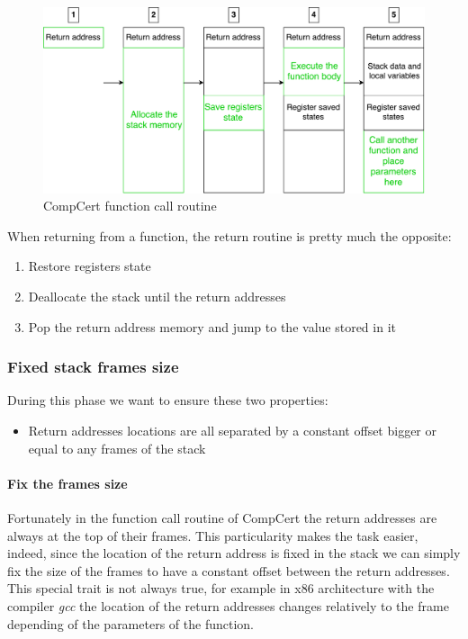 \documentclass[11pt]{sdm}
\begin{document}
\begin{figure}[!ht]
\centering
\includegraphics[scale=0.55]{images/call_routine.pdf}
\caption{CompCert function call routine}
\label{call_routine}
\end{figure}

When returning from a function, the return routine is pretty much the opposite:
\begin{enumerate}
	\item Restore registers state
	\item Deallocate the stack until the return addresses
	\item Pop the return address memory and jump to the value stored in it
\end{enumerate}


\subsubsection{Fixed stack frames size}
\label{sub:Fixed stack frames size}
During this phase we want to ensure these two properties:
\begin{itemize}
	\item Return addresses locations are all separated by a constant offset bigger or equal to any frames of the stack
\end{itemize}

\paragraph{Fix the frames size}
\label{par:Fix the frames size}

Fortunately in the function call routine of CompCert the return addresses are always at the top of their frames.
This particularity makes the task easier, indeed, since the location of the return address is fixed in the stack we can simply fix the size of the frames to have a constant offset between the return addresses. 
This special trait is not always true, for example in x86 architecture with the compiler \textit{gcc} the location of the return addresses changes relatively to the frame depending of the parameters of the function.
\end{document}
